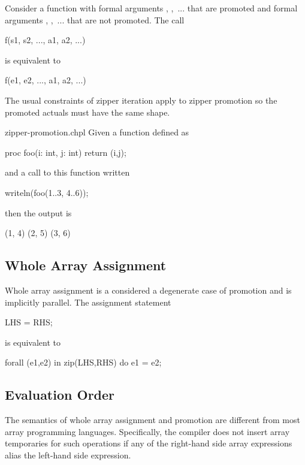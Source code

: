 Consider a function  with formal
arguments , ,~... that are promoted and formal
arguments , ,~... that are not promoted.  The call
\begin{chapel}
f(s1, s2, ..., a1, a2, ...)
\end{chapel}
is equivalent to
\begin{chapel}
[(e1, e2, ...) in zip(s1, s2, ...)] f(e1, e2, ..., a1, a2, ...)
\end{chapel}
The usual constraints of zipper iteration apply to zipper promotion so
the promoted actuals must have the same shape.

\begin{chapelexample}{zipper-promotion.chpl}
Given a function defined as
\begin{chapel}
proc foo(i: int, j: int) {
  return (i,j);
}
\end{chapel}
and a call to this function written
\begin{chapel}
writeln(foo(1..3, 4..6));
\end{chapel}
then the output is
\begin{chapelprintoutput}{}
(1, 4) (2, 5) (3, 6)
\end{chapelprintoutput}
\end{chapelexample}

\subsection{Whole Array Assignment}
\label{Whole_Array_Assignment}

Whole array assignment is a considered a degenerate case of promotion
and is implicitly parallel.  The assignment statement
\begin{chapel}
LHS = RHS;
\end{chapel}
is equivalent to
\begin{chapel}
forall (e1,e2) in zip(LHS,RHS) do
  e1 = e2;
\end{chapel}

\subsection{Evaluation Order}
\label{Evaluation_Order}
The semantics of whole array assignment and promotion are different
from most array programming languages.  Specifically, the compiler
does not insert array temporaries for such operations if any of the
right-hand side array expressions alias the left-hand side expression.

